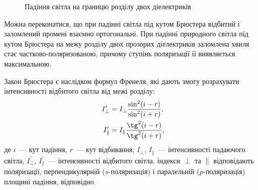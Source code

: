 \begin{figure}[!h]\centering
{}
\label{fig:Intermedia}
\caption{Падіння світла на границю розділу двох діелектриків}
\end{figure}

Можна переконатися, що при падінні світла під кутом Брюстера відбитий і заломлений промені взаємно ортогональні. При падінні природного світла під кутом Брюстера на межу розділу двох прозорих діелектриків заломлена хвиля стає частково-поляризованою, причому ступінь поляризації її виявляється максимальною.

Закон Брюстера є наслідком формул Френеля, які дають змогу розрахувати інтенсивності відбитого світла від межі розділу:
\begin{align}
    I_{\perp}^{\prime} &= I_{\perp}\frac{\sin^2(i - r)}{\sin^2(i + r)}, \\
    I_{\parallel}^{\prime} &= I_{\parallel}\frac{\tg^2(i - r)}{\tg^2(i + r)}, \label{eq:FrenselParallel}
\end{align}
де $i$~--- кут падіння, $r$~--- кут відбивання, $I_{\perp}$, $I_{\parallel}$~--- інтенсивності падаючого світла, $I_{\perp}^{\prime}$, $I_{\parallel}^{\prime}$~--- інтенсивності відбитого світла, індекси $\perp$ та $\parallel$ відповідають поляризації, перпендикулярній ($s$-поляризація) і паралельній ($p$-поляризація) площині падіння, відповідно.
